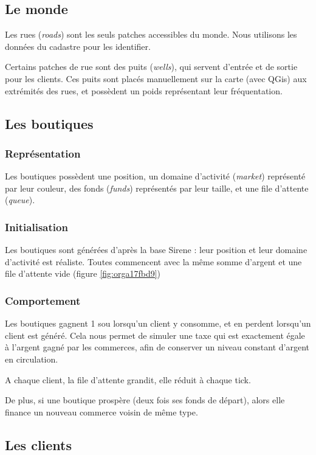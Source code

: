\documentclass[11pt]{article}
\begin{document}
\subsection{Le monde}
\label{sec:orga770fad}
Les rues (\emph{roads}) sont les seuls patches accessibles du monde. 
Nous utilisons les données du cadastre pour les identifier.

Certains patches de rue sont des puits (\emph{wells}), qui servent d'entrée et de
sortie pour les clients. Ces puits sont placés manuellement sur la carte (avec QGis)
aux extrémités des rues, et possèdent un poids représentant leur fréquentation.

\subsection{Les boutiques}
\label{sec:org2c4b9e2}
\subsubsection{Représentation}
\label{sec:orgfe5f0d1}
Les boutiques possèdent une position, un domaine d'activité (\emph{market}) représenté par leur couleur, des fonds (\emph{funds}) représentés par leur taille,
et une file d'attente (\emph{queue}).
\subsubsection{Initialisation}
\label{sec:orgaff91d2}
Les boutiques sont générées d'après la base Sirene : leur position et leur domaine
d'activité est réaliste. Toutes commencent avec la même somme d'argent et une file d'attente vide (figure \ref{fig:orga17fbd9})
\subsubsection{Comportement}
\label{sec:org7a1dd72}
Les boutiques gagnent 1 sou lorsqu'un client y consomme, et en perdent lorsqu'un
client est généré. Cela nous permet de simuler une taxe qui est exactement égale
à l'argent gagné par les commerces, afin de conserver un niveau constant d'argent en circulation.

A chaque client, la file d'attente grandit, elle réduit à chaque tick.

De plus, si une boutique prospère (deux fois ses fonds de départ), alors elle
finance un nouveau commerce voisin de même type.

\subsection{Les clients}
\label{sec:orgf51a887}
\end{document}
